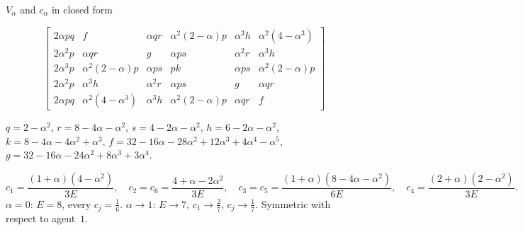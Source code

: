 \begin{frame}[label=bk-lemma-V,t]{$V_\alpha$ and $c_\alpha$ in closed form}
{{\[\begin{bmatrix}
       2\alpha p q & f & \alpha q r & \alpha^2 (2-\alpha) p & \alpha^3 h & \alpha^2(4-\alpha^3) \\
       2\alpha^2 p & \alpha q r & g & \alpha p s & \alpha^2 r & \alpha^3 h \\
       2\alpha^3 p & \alpha^2 (2-\alpha) p & \alpha p s & p k & \alpha p s & \alpha^2 (2-\alpha) p \\
       2\alpha^2 p & \alpha^3 h & \alpha^2 r & \alpha p s & g & \alpha q r \\
       2\alpha p q & \alpha^2(4-\alpha^3) & \alpha^3 h & \alpha^2 (2-\alpha) p & \alpha q r & f
     \end{bmatrix} \]}
  {\scriptsize $q = 2-\alpha^2$, $r = 8-4\alpha-\alpha^2$, $s = 4-2\alpha-\alpha^2$,
  $h = 6-2\alpha-\alpha^2$, $k = 8-4\alpha-4\alpha^2+\alpha^3$,
  $f = 32-16\alpha-28\alpha^2+12\alpha^3+4\alpha^4-\alpha^5$,
  $g = 32-16\alpha-24\alpha^2+8\alpha^3+3\alpha^4$.\par}
  \[ c_1 = \frac{(1+\alpha)(4-\alpha^2)}{3E}, \quad
     c_2 = c_6 = \frac{4+\alpha-2\alpha^2}{3E}, \quad
     c_3 = c_5 = \frac{(1+\alpha)(8-4\alpha-\alpha^2)}{6E}, \quad
     c_4 = \frac{(2+\alpha)(2-\alpha^2)}{3E}. \]
  $\alpha = 0$: $E = 8$, every $c_j = \frac16$. $\alpha \to 1$: $E \to 7$, $c_1 \to \frac27$,
  $c_j \to \frac17$. Symmetric with respect to agent~$1$.}%
\end{frame}


